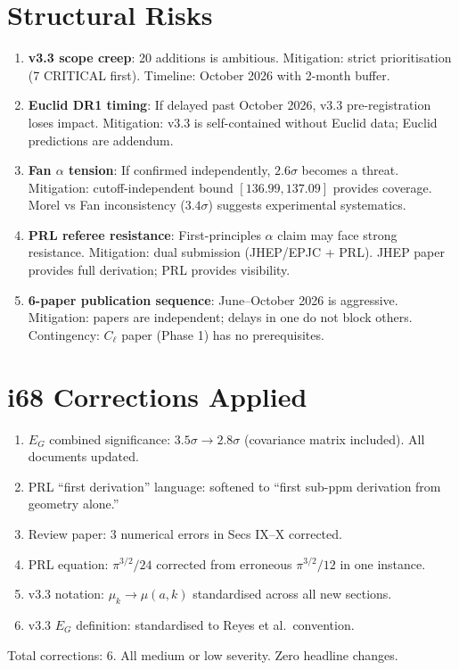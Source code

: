 \documentclass[11pt,a4paper]{article}
\begin{document}
\section{Structural Risks}

\begin{enumerate}[nosep]
\item \textbf{v3.3 scope creep}: 20 additions is ambitious. Mitigation: strict prioritisation (7 CRITICAL first). Timeline: October 2026 with 2-month buffer.

\item \textbf{Euclid DR1 timing}: If delayed past October 2026, v3.3 pre-registration loses impact. Mitigation: v3.3 is self-contained without Euclid data; Euclid predictions are addendum.

\item \textbf{Fan $\alpha$ tension}: If confirmed independently, $2.6\sigma$ becomes a threat. Mitigation: cutoff-independent bound $[136.99, 137.09]$ provides coverage. Morel vs Fan inconsistency ($3.4\sigma$) suggests experimental systematics.

\item \textbf{PRL referee resistance}: First-principles $\alpha$ claim may face strong resistance. Mitigation: dual submission (JHEP/EPJC + PRL). JHEP paper provides full derivation; PRL provides visibility.

\item \textbf{6-paper publication sequence}: June--October 2026 is aggressive. Mitigation: papers are independent; delays in one do not block others. Contingency: $C_\ell$ paper (Phase 1) has no prerequisites.
\end{enumerate}


\section{i68 Corrections Applied}

\begin{enumerate}[nosep]
\item $E_G$ combined significance: $3.5\sigma \to 2.8\sigma$ (covariance matrix included). All documents updated.
\item PRL ``first derivation'' language: softened to ``first sub-ppm derivation from geometry alone.''
\item Review paper: 3 numerical errors in Secs IX--X corrected.
\item PRL equation: $\pi^{3/2}/24$ corrected from erroneous $\pi^{3/2}/12$ in one instance.
\item v3.3 notation: $\mu_k \to \mu(a,k)$ standardised across all new sections.
\item v3.3 $E_G$ definition: standardised to Reyes et al.\ convention.
\end{enumerate}

Total corrections: 6. All medium or low severity. Zero headline changes.
\end{document}
